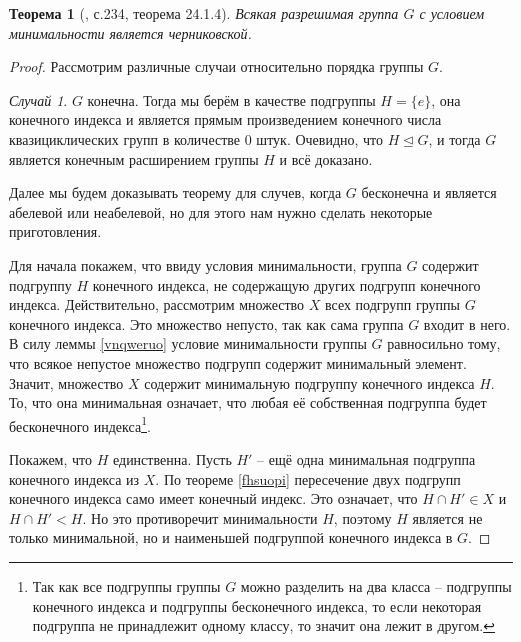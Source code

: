 \documentclass{article}
\newtheorem{theorem}{Теорема}[section]
\begin{document}
\begin{theorem}[\cite{kargapolov}, с.234, теорема 24.1.4]
    Всякая разрешимая группа $G$ с условием минимальности является черниковской.
\end{theorem}
\begin{proof}
    Рассмотрим различные случаи относительно порядка группы $G$.

    \textit{Случай 1}. $G$ конечна. Тогда мы берём в качестве подгруппы $H = \{ e \}$, она конечного индекса и является прямым произведением конечного числа квазициклических групп в количестве 0 штук. Очевидно, что $H \trianglelefteq G$, и тогда $G$ является конечным расширением группы $H$ и всё доказано.

    Далее мы будем доказывать теорему для случев, когда $G$ бесконечна и является абелевой или неабелевой, но для этого нам нужно сделать некоторые приготовления.

    Для начала покажем, что ввиду условия минимальности, группа $G$ содержит подгруппу $H$ конечного индекса, не содержащую других подгрупп конечного индекса. Действительно, рассмотрим множество $X$ всех подгрупп группы $G$ конечного индекса. Это множество непусто, так как сама группа $G$ входит в него. В силу леммы \ref{vnqweruo} условие минимальности группы $G$ равносильно тому, что всякое непустое множество подгрупп содержит минимальный элемент. Значит, множество $X$ содержит минимальную подгруппу конечного индекса $H$. То, что она минимальная означает, что любая её собственная подгруппа будет бесконечного индекса\footnote{Так как все подгруппы группы $G$ можно разделить на два класса -- подгруппы конечного индекса и подгруппы бесконечного индекса, то если некоторая подгруппа не принадлежит одному классу, то значит она лежит в другом.}.

    Покажем, что $H$ единственна. Пусть $H'$ -- ещё одна минимальная подгруппа конечного индекса из $X$. По теореме \ref{fhsuopi} пересечение двух подгрупп конечного индекса само имеет конечный индекс. Это означает, что $H \cap H' \in X$ и $H \cap H' < H$. Но это противоречит минимальности $H$, поэтому $H$ является не только минимальной, но и наименьшей подгруппой конечного индекса в $G$.


\end{proof}
\end{document}
